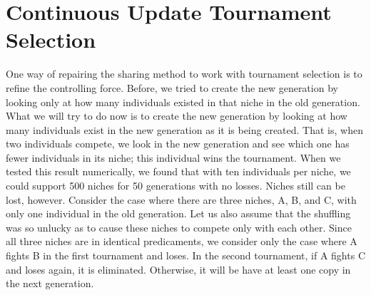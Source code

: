 \section{Continuous Update Tournament Selection}
One way of repairing the sharing method to work with tournament selection
is to refine the controlling force.  Before, we tried to create the
new generation by looking only at how many individuals existed in that
niche in the old generation.  What we will try to do now is to create
the new generation by looking at how many individuals exist in the new
generation as it is being created.  That is, when two individuals
compete, we look in the new generation and see which one has fewer
individuals in its niche; this individual wins the tournament.  When we
tested this result numerically, we found that with ten individuals per
niche, we could support 500 niches for 50 generations with no losses.
Niches still can be lost, however.  Consider the case where there are three
niches, A, B, and C, with only one individual in the old generation.
Let us also assume that the shuffling was so unlucky as to cause these niches
to compete only with each other.  Since all three niches are in identical
predicaments, we consider only the case where A fights B in the first
tournament and loses.  In the second tournament, if A fights C and loses
again, it is eliminated.  Otherwise, it will be have at least one copy
in the next generation.

